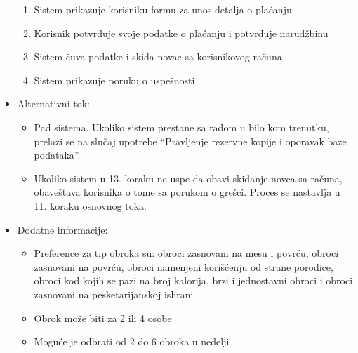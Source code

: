 \begin{itemize}
\begin{enumerate}
            \item Sistem prikazuje korisniku formu za unos detalja o plaćanju
            \item Korisnik potvrđuje svoje podatke o plaćanju i potvrđuje narudžbinu
            \item Sistem čuva podatke i skida novac sa korisnikovog računa
            \item Sistem prikazuje poruku o uspešnosti 
        \end{enumerate}
    \item Alternativni tok:
        \begin{itemize}
            \item Pad sistema. Ukoliko sistem prestane sa radom u bilo kom trenutku, prelazi se na slučaj upotrebe ``Pravljenje rezervne kopije i oporavak baze podataka''.
            \item Ukoliko sistem u 13. koraku ne uspe da obavi skidanje novca sa računa, obaveštava korisnika o tome sa porukom o grešci. Proces se nastavlja u 11. koraku osnovnog toka.
        \end{itemize}
    \item Dodatne informacije:
        \begin{itemize}
            \item Preference za tip obroka su: obroci zasnovani na mesu i povrću, obroci zasnovani na povrću, obroci namenjeni korišćenju od strane porodice, obroci kod kojih se pazi na broj kalorija, brzi i jednostavni obroci i obroci zasnovani na pesketarijanskoj ishrani 
            \item Obrok može biti za 2 ili 4 osobe
            \item Moguće je odbrati od 2 do 6 obroka u nedelji
        \end{itemize}
\end{itemize}

